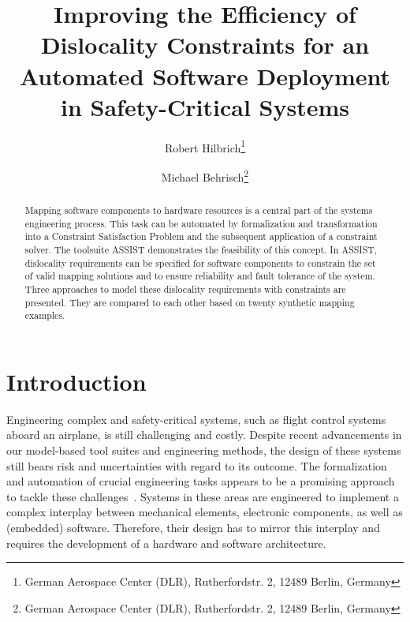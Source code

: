 \documentclass[english,biblatex]{lni}
\begin{document}
\title[Improving the Efficiency of Dislocality Constraints]{Improving the Efficiency of Dislocality Constraints for an Automated Software Deployment in Safety-Critical Systems}
\author[Robert Hilbrich \and Michael Behrisch]
{Robert Hilbrich\footnote{German Aerospace Center (DLR), Rutherfordstr. 2, 12489 Berlin,
Germany } \and
Michael Behrisch\footnote{German Aerospace Center (DLR), Rutherfordstr. 2, 12489 Berlin,
Germany }}

\maketitle

\begin{abstract}
  Mapping software components to hardware resources is a central part of the systems engineering process. 
  This task can be automated by formalization and transformation into a Constraint Satisfaction Problem and the subsequent application of a constraint solver.
  The toolsuite ASSIST demonstrates the feasibility of this concept.
  In ASSIST, dislocality requirements can be specified for software components to constrain the set of valid mapping solutions and to ensure reliability and fault tolerance of the system.
  Three approaches to model these dislocality requirements with constraints are presented.
  They are compared to each other based on twenty synthetic mapping examples.
\end{abstract}




\section{Introduction}

Engineering complex and safety-critical systems, such as flight control systems aboard an airplane, is still challenging and costly.
Despite recent advancements in our model-based tool suites and engineering methods, the design of these systems still bears risk and uncertainties with regard to its outcome.
The formalization and automation of crucial engineering tasks appears to be a promising approach to tackle these challenges~\cite{Chapman2007,Hilbrich2015}.
Systems in these areas are engineered to implement a complex interplay between mechanical elements, electronic components, as well as (embedded) software.
Therefore, their design has to mirror this interplay and requires the development of a hardware and software architecture.
\end{document}
